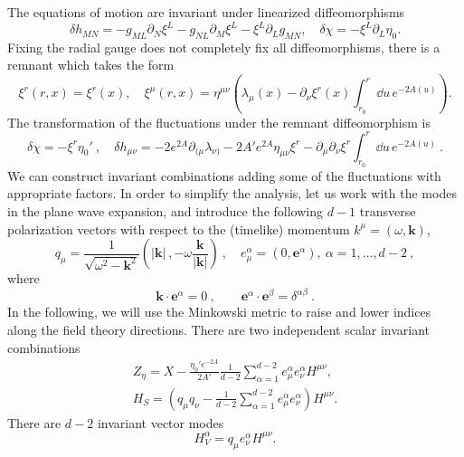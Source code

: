 The equations of motion are invariant under linearized diffeomorphisms
\begin{equation}
	\delta h_{MN}=-g_{ML}\partial_N \xi^L-g_{NL}\partial_M \xi^L-\xi^L\partial_L g_{MN},\quad \delta \chi=-\xi^L\partial_L\eta_0.
\end{equation}
Fixing the radial gauge does not completely fix all diffeomorphisms, there is a remnant which takes the form
\begin{equation}
	\xi^r(r,x)=\xi^r(x),\quad \xi^\mu(r,x)=\eta^{\mu\nu}\left(\lambda_\mu(x)-\partial_\nu\xi^r(x)\int_{r_0}^r \dd u\, e^{-2A(u)}\right).
\end{equation}
The transformation of the fluctuations under the remnant diffeomorphism is
\begin{equation}
	\delta \chi=-\xi^r\eta_0'
	\ ,\quad 
	\delta h_{\mu\nu}=-2e^{2A}\partial_{(\mu}\lambda_{\nu)}-2 A' e^{2A}\eta_{\mu\nu}\xi^r-\partial_\mu\partial_\nu\xi^r\int_{r_0}^r \dd u\, e^{-2A(u)}\ .
\end{equation}
We can construct invariant combinations adding some of the fluctuations with appropriate factors. In order to simplify the analysis, let us work with the modes in the plane wave expansion, and introduce the following $d-1$ transverse polarization vectors with respect to the (timelike) momentum $k^\mu=(\omega,\bm{k})$,
\begin{equation}
q_\mu=\frac{1}{\sqrt{\omega^2-\bm{k}^2}}\left(|\bm{k}|\ ,-\omega\frac{\bm{k}}{|\bm{k}|}\right)\ ,\quad e_\mu^\alpha=(0,\bm{e}^\alpha), \ \alpha=1,\dots,d-2\ ,
\end{equation}
where
\begin{equation}
     \bm{k}\cdot\bm{e}^\alpha=0
     \ ,\qquad \bm{e}^\alpha\cdot\bm{e}^\beta=\delta^{\alpha\beta}\ .
\end{equation}
In the following, we will use the Minkowski metric to raise and lower indices along the field theory directions. There are two independent scalar invariant combinations
\begin{eqnarray}
 \label{eq:zetaeta}   
 Z_\eta=X-\frac{\eta_0'e^{-2A}}{2A'}\frac{1}{d-2}\sum_{\alpha=1}^{d-2}e_\mu^\alpha e_\nu^\alpha H^{\mu\nu}
 ,\\
 \label{eq:HS}
 H_S=\left(q_\mu q_\nu-\frac{1}{d-2}\sum_{\alpha=1}^{d-2}e_\mu^\alpha e_\nu^\alpha\right)H^{\mu\nu}.
\end{eqnarray}
There are $d-2$ invariant vector modes 
\begin{equation}
	H_V^\alpha=q_\mu e_\nu^\alpha H^{\mu\nu}.
\end{equation}
